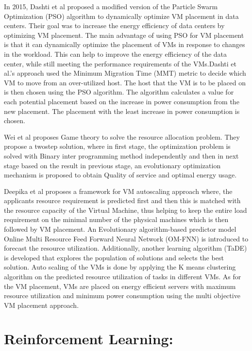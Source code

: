 \documentclass[a4paper,12pt]{Classes/RoboticsLaTeX}
\begin{document}
    In 2015, Dashti et al \cite{dashti2016dynamic} proposed a modified version of the Particle Swarm Optimization (PSO) algorithm to dynamically optimize VM placement in data centers. Their goal was to increase the energy efficiency of data centers by optimizing VM placement. The main advantage of using PSO for VM placement is that it can dynamically optimize the placement of VMs in response to changes in the workload. This can help to improve the energy efficiency of the data center, while still meeting the performance requirements of the VMs.Dashti et al.'s approach used the Minimum Migration Time (MMT) metric to decide which VM to move from an over-utilized host. The host that the VM is to be placed on is then chosen using the PSO algorithm. The algorithm calculates a value for each potential placement based on the increase in power consumption from the new placement. The placement with the least increase in power consumption is chosen.
    
    Wei et al \cite{wei2010game}proposes Game theory to solve the resource allocation problem. They propose a twostep solution, where in first stage, the optimization problem is solved with Binary inter programming method independently and then in next stage based on the result in previous stage, an evolutionary optimization mechanism is proposed to obtain Quality of service and optimal energy usage.
    
    Deepika et al \cite{saxena2021proactive}proposes a framework for VM autoscaling approach where, the applicants resource requirement is predicted first and then this is matched with the resource capacity of the Virtual Machine, thus helping to keep the entire load requirement on the minimal number of the physical machines which is then followed by VM placement. An Evolutionary algorithm-based predictor model Online Multi Resource Feed Forward Neural Network (OM-FNN) is introduced to forecast the resource utilization. Additionally, another learning algorithm (TaDE) is developed that explores the population of solutions and selects the best solution. Auto scaling of the VMs is done by applying the K means clustering algorithm on the predicted resource utilization of tasks in different VMs. As for the VM placement, VMs are placed on energy efficient servers with maximum resource utilization and minimum power consumption using the multi objective VM placement approach.
    
    \section{Reinforcement Learning:}
    
\end{document}

